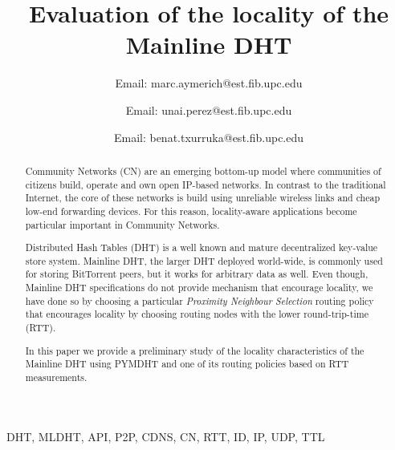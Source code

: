 \documentclass[conference]{IEEEtran}
\begin{document}
%
\title{Evaluation of the locality of the Mainline DHT}


\author{
Email: marc.aymerich@est.fib.upc.edu
\and
{}
Email: unai.perez@est.fib.upc.edu
\and
{}
Email: benat.txurruka@est.fib.upc.edu}


\maketitle


\begin{abstract}
Community Networks (CN) are an emerging bottom-up model where communities of citizens build, operate and own open IP-based networks. In contrast to the traditional Internet, the core of these networks is build using unreliable wireless links and cheap low-end forwarding devices. For this reason, locality-aware applications become particular important in Community Networks.

Distributed Hash Tables (DHT) is a well known and mature decentralized key-value store system. Mainline DHT, the larger DHT deployed world-wide, is commonly used for storing BitTorrent peers, but it works for arbitrary data as well. Even though, Mainline DHT specifications do not provide mechanism that encourage locality, we have done so by choosing a particular \textit{Proximity Neighbour Selection} routing policy that encourages locality by choosing routing nodes with the lower round-trip-time (RTT).

In this paper we provide a preliminary study of the locality characteristics of the Mainline DHT using PYMDHT and one of its routing policies based on RTT measurements.
\end{abstract}


\begin{IEEEkeywords}
DHT, MLDHT, API, P2P, CDNS, CN, RTT, ID, IP, UDP, TTL
\end{IEEEkeywords}

	
\end{document}
